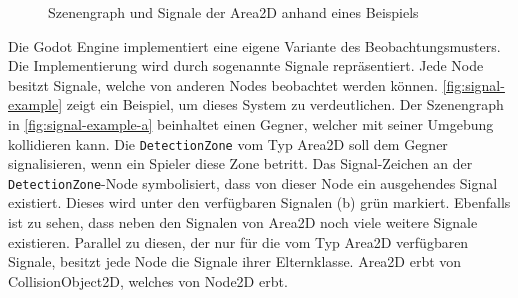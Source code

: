\begin{figure}[H]%
    \centering
    \qquad
    \caption{Szenengraph und Signale der Area2D anhand eines Beispiels}%
    \label{fig:signal-example}%
\end{figure}

Die Godot Engine implementiert eine eigene Variante des Beobachtungsmusters\cite{godot-signals}\cite[293]{design-patterns-gof}. Die Implementierung wird durch sogenannte Signale repräsentiert. Jede Node besitzt Signale, welche von anderen Nodes beobachtet werden können. \autoref{fig:signal-example} zeigt ein Beispiel, um dieses System zu verdeutlichen. Der Szenengraph in \autoref{fig:signal-example-a} beinhaltet einen Gegner, welcher mit seiner Umgebung kollidieren kann. Die \texttt{DetectionZone} vom Typ Area2D soll dem Gegner signalisieren, wenn ein Spieler diese Zone betritt. Das Signal-Zeichen an der \texttt{DetectionZone}-Node symbolisiert, dass von dieser Node ein ausgehendes Signal existiert. Dieses wird unter den verfügbaren Signalen (b) grün markiert. Ebenfalls ist zu sehen, dass neben den Signalen von Area2D noch viele weitere Signale existieren. Parallel zu diesen, der nur für die vom Typ Area2D verfügbaren Signale, besitzt jede Node die Signale ihrer Elternklasse. Area2D erbt von CollisionObject2D, welches von Node2D erbt. \\

